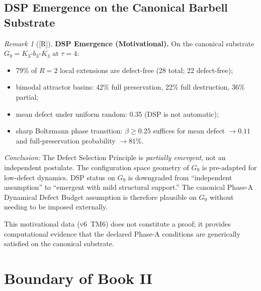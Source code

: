 \documentclass[12pt,oneside]{amsbook}
\theoremstyle{plain}
\theoremstyle{definition}
\theoremstyle{remark}
\newtheorem{remark}[theorem]{Remark}
\newcommand{\status}[1]{\textup{[#1]}}
\begin{document}
\subsection{DSP Emergence on the Canonical Barbell Substrate}

\begin{remark}[\status{R}]\label{rem:DSP-emergence}
\textbf{DSP Emergence (Motivational).}
On the canonical substrate $G_9 = K_3\text{-}b_3\text{-}K_3$ at
$\tau=4$:
\begin{itemize}
  \item 79\% of $R=2$ local extensions are defect-free (28 total;
    22 defect-free);
  \item bimodal attractor basins: 42\% full preservation, 22\% full
    destruction, 36\% partial;
  \item mean defect under uniform random: 0.35 (DSP is not automatic);
  \item sharp Boltzmann phase transition: $\beta \geq 0.25$ suffices
    for mean defect $\to 0.11$ and full-preservation probability
    $\to 81\%$.
\end{itemize}
\emph{Conclusion:} The Defect Selection Principle is \emph{partially
emergent}, not an independent postulate.  The configuration space
geometry of $G_9$ is pre-adapted for low-defect dynamics.  DSP
status on $G_9$ is downgraded from ``independent assumption'' to
``emergent with mild structural support.''  The canonical
Phase-A Dynamical Defect Budget assumption is therefore plausible on
$G_9$ without needing to be imposed externally.

This motivational data (v6~TM6) does not constitute a proof; it
provides computational evidence that the declared Phase-A conditions
are generically satisfied on the canonical substrate.
\end{remark}

\section{Boundary of Book II}
\end{document}
